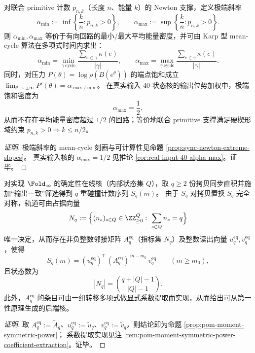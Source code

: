 \begin{conclusion}\label{con:xi-terminal-newton-extreme-slopes-alpha-half}
对联合 primitive 计数 \(p_{n,k}\)（长度 \(n\)、能量 \(k\)）的 Newton 支撑，定义极端斜率
\[
\alpha_{\min}:=\inf\left\{\frac{k}{n}:p_{n,k}>0\right\},\qquad
\alpha_{\max}:=\sup\left\{\frac{k}{n}:p_{n,k}>0\right\}.
\]
则 \(\alpha_{\min},\alpha_{\max}\) 等价于有向回路的最小/最大平均能量密度，并可由 Karp 型 mean-cycle 算法在多项式时间内求出：
\[
\alpha_{\min}=\min_{\gamma\ \mathrm{cycle}}\frac{\sum_{e\in\gamma}\kappa(e)}{|\gamma|},\qquad
\alpha_{\max}=\max_{\gamma\ \mathrm{cycle}}\frac{\sum_{e\in\gamma}\kappa(e)}{|\gamma|}.
\]
同时，对压力 \(P(\theta)=\log\rho(B(e^\theta))\) 的端点饱和成立
\(
\lim_{\theta\to\pm\infty}P'(\theta)=\alpha_{\max/\min}
\)。
在真实输入 \(40\) 状态核的输出位势加权中，极端饱和密度为
\[
\alpha_{\max}=\frac12,
\]
从而不存在平均能量密度超过 \(1/2\) 的回路；等价地联合 primitive 支撑满足硬楔形域约束 \(p_{n,k}>0\Rightarrow k\le n/2\)。
\end{conclusion}
\begin{proof}[证明]
极端斜率的 mean-cycle 刻画与可计算性见命题 \ref{prop:sync-newton-extreme-slopes}。
真实输入核的 \(\alpha_{\max}=1/2\) 见推论 \ref{cor:real-input-40-alpha-max}。证毕。
\end{proof}

\begin{conclusion}\label{con:xi-terminal-sympower-quotient-kernel-poly-state}
对实现 \(\Fold_\infty\) 的确定性在线核（内部状态集 \(Q\)），取 \(q\ge 2\) 份拷贝同步直积并施加“输出一致”筛选得到 \(q\)-重碰撞计数序列 \(S_q(m)\)。
由于 \(S_q\) 对拷贝置换 \(S_q\) 完全对称，轨道可由占据向量
\[
N_q:=\Bigl\{(n_s)_{s\in Q}\in\ZZ_{\ge 0}^{Q}:\ \sum_{s\in Q}n_s=q\Bigr\}
\]
唯一决定，从而存在非负整数邻接矩阵 \(A^{\mathrm{eq}}_q\)（指标集 \(N_q\)）及整数读出向量 \(u^{\mathrm{eq}}_q,v^{\mathrm{eq}}_q\)，使得
\[
S_q(m)= (u^{\mathrm{eq}}_q)^{\mathsf T}\,(A^{\mathrm{eq}}_q)^{\,m-m_0}\,v^{\mathrm{eq}}_q\qquad(m\ge m_0),
\]
且状态数为
\[
|N_q|=\binom{q+|Q|-1}{|Q|-1}.
\]
此外，\(A^{\mathrm{eq}}_q\) 的条目可由一组转移多项式做显式系数提取而实现，从而给出可从第一性原理生成的后端核。
\end{conclusion}
\begin{proof}[证明]
取 \(A^{\mathrm{eq}}_q:=\widetilde A_q\)、\(u^{\mathrm{eq}}_q:=\widetilde u_q\)、\(v^{\mathrm{eq}}_q:=\widetilde v_q\)，则结论即为命题 \ref{prop:pom-moment-symmetric-power}；
系数提取实现见注 \ref{rem:pom-moment-symmetric-power-coefficient-extraction}。证毕。
\end{proof}

